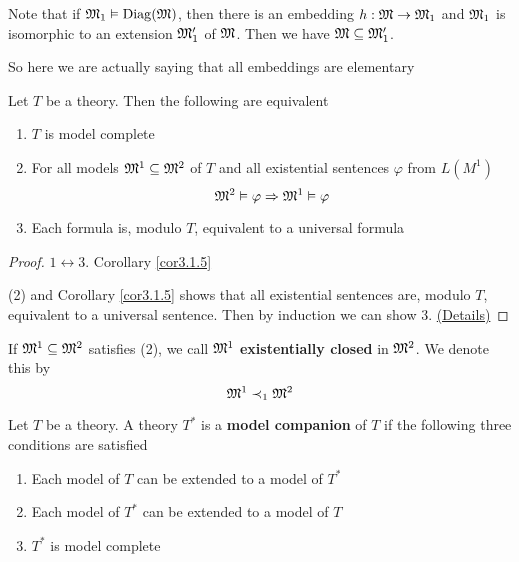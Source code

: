 \documentclass[11pt]{article}
\begin{document}
Note that if \(\mathfrak{M}_1\vDash\operatorname{Diag}(\mathfrak{M})\), then there is an embedding \(h:\mathfrak{M}\to\mathfrak{M}_1\) and \(\mathfrak{M}_1\) is isomorphic to
an extension \(\mathfrak{M}_1'\) of \(\mathfrak{M}\). Then we have \(\mathfrak{M}\subseteq\mathfrak{M}_1'\).

So here we are actually saying that all embeddings are elementary

\begin{lemma}
\label{lemma3.2.7}
Let \(T\) be a theory. Then the following are equivalent
\begin{enumerate}
\item \(T\) is model complete
\item For all models \(\mathfrak{M}^1\subseteq\mathfrak{M}^2\) of \(T\) and all existential
sentences \(\varphi\) from \(L(M^1)\)
\begin{equation*}
\mathfrak{M}^2\vDash\varphi\Rightarrow\mathfrak{M}^1\vDash\varphi
\end{equation*}
\item Each formula is, modulo \(T\), equivalent to a universal formula
\end{enumerate}
\end{lemma}

\begin{proof}
\(1\leftrightarrow3\). Corollary \ref{cor3.1.5}

(2) and Corollary \ref{cor3.1.5} shows that all existential sentences are, modulo \(T\), equivalent
to a universal sentence. Then by induction we can show 3. \href{https://math.stackexchange.com/questions/321737/proof-of-robinsons-test/2050990}{(Details)}
\end{proof}

If \(\mathfrak{M}^1\subseteq\mathfrak{M}^2\) satisfies (2), we call \(\mathfrak{M}^1\) \textbf{existentially
closed} in \(\mathfrak{M}^2\). We denote this by
\begin{equation*}
\mathfrak{M}^1\prec_1\mathfrak{M}^2
\end{equation*}

\begin{definition}[]
Let \(T\) be a theory. A theory \(T^*\) is a \textbf{model companion} of \(T\) if the
following three conditions are satisfied
\begin{enumerate}
\item Each model of \(T\) can be extended to a model of \(T^*\)
\item Each model of \(T^*\) can be extended to a model of \(T\)
\item \(T^*\) is model complete
\end{enumerate}
\end{definition}
\end{document}
